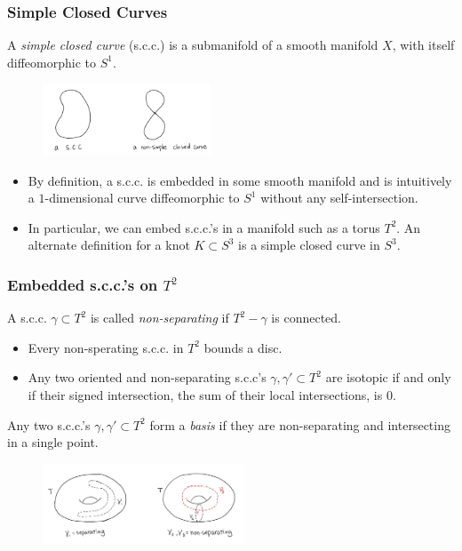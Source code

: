 \documentclass{beamer}
\theoremstyle{ex}
\theoremstyle{rem}
\begin{document}
	\begin{frame}
		\frametitle{Simple Closed Curves}
		\begin{definition}
			A \textit{simple closed curve} (s.c.c.) is a submanifold of a smooth manifold $X$, with itself diffeomorphic to $S^1$.
		\end{definition}
		\begin{figure}
			\centering
			\includegraphics[width=50mm]{scc.jpg}
		\end{figure}
		\begin{itemize}
		\item By definition, a s.c.c. is embedded in some smooth manifold and is intuitively a $1$-dimensional curve diffeomorphic to $S^1$ without any self-intersection. 
		\item In particular, we can embed s.c.c.'s in a manifold such as a torus $T^2$. An alternate definition for a knot $K \subset S^3$ is a simple closed curve in $S^3$.
		\end{itemize}
	\end{frame}	

	\begin{frame}	
		\frametitle{Embedded s.c.c.'s on $T^2$}
		\begin{definition}
			A s.c.c. $\gamma \subset T^2$ is called \textit{non-separating} if $T^2-\gamma$ is connected.
		\end{definition}
		\begin{itemize}
		\item Every non-sperating s.c.c. in $T^2$ bounds a disc.
		\item Any two oriented and non-separating s.c.c's $\gamma, \gamma' \subset T^2$ are isotopic if and only if their signed intersection, the sum of their local intersections, is $0$.
		\end{itemize}
		\begin{definition} 
			Any two s.c.c.'s $\gamma, \gamma' \subset T^2$ form a \textit{basis} if they are non-separating and intersecting in a single point. 
		\end{definition}
		\begin{figure}
			\centering
			\includegraphics[width=60mm]{Separating.jpg}
		\end{figure}
	\end{frame}
\end{document}
